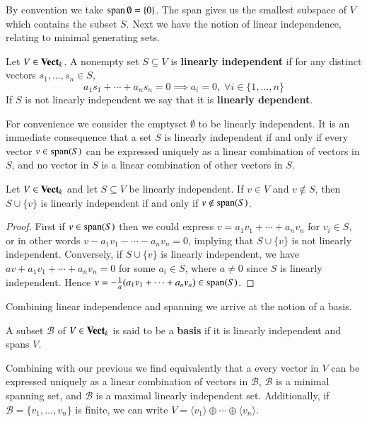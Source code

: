 By convention we take $\operatorname{span}\emptyset = \{0\}$. The span gives us the smallest subspace of $V$ which contains the subset $S$. Next we have the notion of linear independence, relating to minimal generating sets.

\begin{definition}
    Let $V \in \normalfont\textbf{Vect}_{k}$. A nonempty set $S \subseteq V$ is \textbf{linearly independent} if for any distinct vectors $s_1,...,s_n \in S$, \begin{equation*}
        a_1s_1+\cdots +a_ns_n = 0\implies a_i = 0,\;\forall i \in \{1,...,n\}
    \end{equation*}
    If $S$ is not linearly independent we say that it is \textbf{linearly dependent}.
\end{definition}

For convenience we consider the emptyset $\emptyset$ to be linearly independent. It is an immediate consequence that a set $S$ is linearly independent if and only if every vector $v \in \operatorname{span}(S)$ can be expressed uniquely as a linear combination of vectors in $S$, and no vector in $S$ is a linear combination of other vectors in $S$. 

\begin{theorem}
    Let $V \in \normalfont\textbf{Vect}_{k}$ and let $S \subseteq V$ be linearly independent. If $v \in V$ and $v \notin S$, then $S \cup \{v\}$ is linearly independent if and only if $v \notin \operatorname{span}(S)$.
\end{theorem}
\begin{proof}
    First if $v \in \operatorname{span}(S)$ then we could express $v = a_1v_1+\cdots +a_nv_n$ for $v_i \in S$, or in other words $v-a_1v_1-\cdots - a_nv_n = 0$, implying that $S\cup\{v\}$ is not linearly independent. Conversely, if $S \cup \{v\}$ is linearly independent, we have $av+a_1v_1+\cdots +a_nv_n = 0$ for some $a_i \in S$, where $a \neq 0$ since $S$ is linearly independent. Hence $v = -\frac{1}{a}(a_1v_1+\cdots +a_nv_n) \in \operatorname{span}(S)$.
\end{proof}

Combining linear independence and spanning we arrive at the notion of a basis.

\begin{definition}
    A subset $\mathcal{B}$ of $V \in \normalfont\textbf{Vect}_{k}$ is said to be a \textbf{basis} if it is linearly independent and spans $V$.
\end{definition}

Combining with our previous we find equivalently that a every vector in $V$ can be expressed uniquely as a linear combination of vectors in $\mathcal{B}$, $\mathcal{B}$ is a minimal spanning set, and $\mathcal{B}$ is a maximal linearly independent set. Additionally, if $\mathcal{B} = \{v_1,...,v_n\}$ is finite, we can write $V = \langle v_1\rangle \oplus \cdots \oplus \langle v_n\rangle$.

